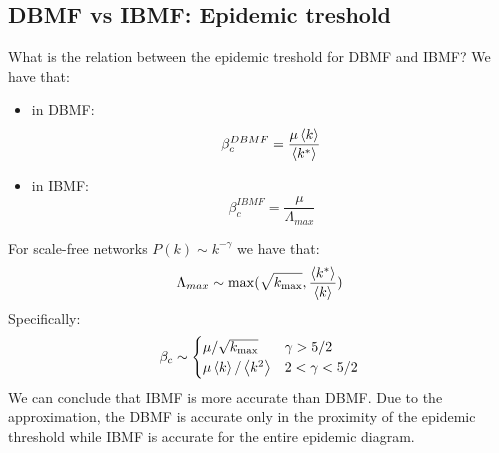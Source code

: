 \documentclass[../main/main.tex]{subfiles}
\begin{document}
\subsection{DBMF vs IBMF: Epidemic treshold}
What is the relation between the epidemic treshold for DBMF and IBMF?
We have that:
\begin{itemize}
\item in DBMF:
\begin{equation*}
  \beta _c^{DBMF} = \frac{\mu \expval{k} }{\expval{k^*} }
\end{equation*}

\item in IBMF:
\begin{equation*}
\beta _c^{IBMF} = \frac{\mu }{\Lambda _{max}}
\end{equation*}
\end{itemize}
For scale-free networks \( P(k) \sim k^{-\gamma  } \) we have that:
\begin{equation}
  \Lambda _{max} \sim \max(\sqrt{k_{\max}}, \frac{\expval{k^*}}{\expval{k}}   )
\end{equation}
Specifically:
\begin{equation}
\beta _c \sim
  \begin{cases}
   \mu / \sqrt{k_{\max}} & \gamma > 5/2  \\
   \mu \expval{k}/\expval{k^2} & 2 < \gamma < 5/2
  \end{cases}
\end{equation}
We can conclude that IBMF is more accurate than DBMF.
Due to the approximation, the DBMF is accurate only in the proximity of the epidemic threshold while IBMF is accurate for the entire epidemic diagram.
\end{document}
